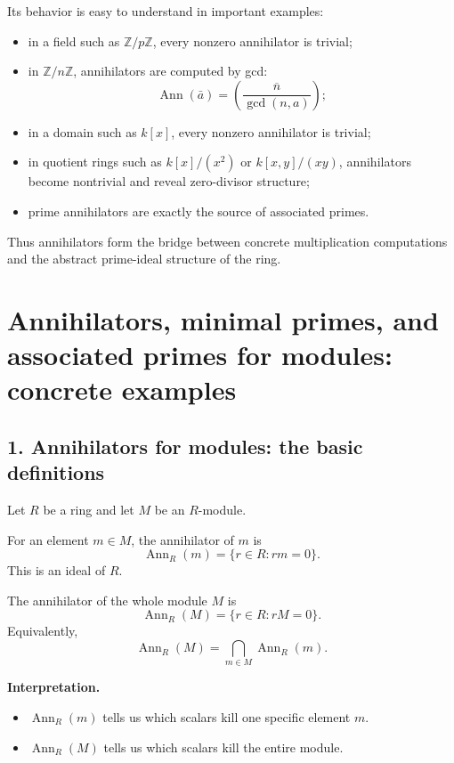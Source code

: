 \documentclass[12pt,a4paper,oneside]{report}
\DeclareMathOperator{\Ann}{Ann}
\theoremstyle{notespace}
\begin{document}
	Its behavior is easy to understand in important examples:
	
	\begin{itemize}
		\item in a field such as \(\mathbb Z/p\mathbb Z\), every nonzero annihilator is trivial;
		\item in \(\mathbb Z/n\mathbb Z\), annihilators are computed by gcd:
		\[
		\Ann(\bar a)=\left(\overline{\frac{n}{\gcd(n,a)}}\right);
		\]
		\item in a domain such as \(k[x]\), every nonzero annihilator is trivial;
		\item in quotient rings such as \(k[x]/(x^2)\) or \(k[x,y]/(xy)\), annihilators become nontrivial and reveal zero-divisor structure;
		\item prime annihilators are exactly the source of associated primes.
	\end{itemize}
	
	Thus annihilators form the bridge between concrete multiplication computations and the abstract prime-ideal structure of the ring.
	
	\section{Annihilators, minimal primes, and associated primes for modules: concrete examples}
	
	\subsection{1. Annihilators for modules: the basic definitions}
	
	Let \(R\) be a ring and let \(M\) be an \(R\)-module.
	
	For an element \(m\in M\), the annihilator of \(m\) is
	\[
	\Ann_R(m)=\{r\in R:rm=0\}.
	\]
	This is an ideal of \(R\).
	
	The annihilator of the whole module \(M\) is
	\[
	\Ann_R(M)=\{r\in R:rM=0\}.
	\]
	Equivalently,
	\[
	\Ann_R(M)=\bigcap_{m\in M}\Ann_R(m).
	\]
	
	\medskip
	
	\noindent
	\textbf{Interpretation.}
	\begin{itemize}
		\item \(\Ann_R(m)\) tells us which scalars kill one specific element \(m\).
		\item \(\Ann_R(M)\) tells us which scalars kill the entire module.
	\end{itemize}
	
\end{document}
